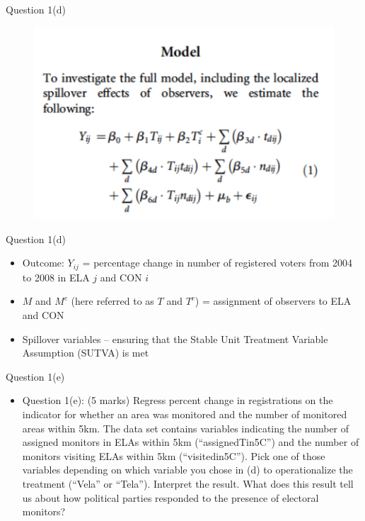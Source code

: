\documentclass[xcolor=table,dvipsnames]{beamer}
\begin{document}
\begin{frame}{Question 1(d)}
\begin{figure}[H]\centering
\includegraphics[scale=.7]{pictures/ichinoSchuendeln_statsModel.pdf}
\end{figure}
\end{frame}


\begin{frame}{Question 1(d)}
\begin{itemize}
\item Outcome: $Y_{ij}$ = percentage change in number of registered voters from 2004 to 2008 in ELA $j$ and CON $i$ \pause
\item $M$ and $M^c$ (here referred to as $T$ and $T^c$) = assignment of observers to ELA and CON \pause
\item Spillover variables  \pause -- ensuring that the Stable Unit Treatment Variable Assumption (SUTVA) is met
\end{itemize}
\end{frame}

\begin{frame}{Question 1(e)}
\begin{itemize}
\item[] Question 1(e): (5 marks) Regress percent change in registrations on the indicator for whether an area was monitored and the number of monitored areas within 5km.
The data set contains variables indicating the number of assigned monitors in ELAs within 5km (``assignedTin5C'') and the number of monitors visiting ELAs within 5km (``visitedin5C'').
Pick one of those variables depending on which variable you chose in (d) to operationalize the treatment (``Vela'' or ``Tela''). 
Interpret the result. 
What does this result tell us about how political parties responded to the presence of electoral monitors?
\end{itemize}
\end{frame}
\end{document}
